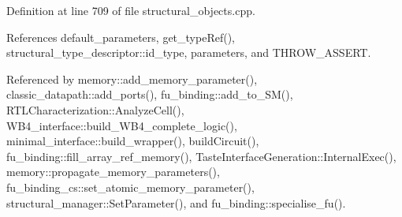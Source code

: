 Definition at line 709 of file structural\+\_\+objects.\+cpp.



References default\+\_\+parameters, get\+\_\+type\+Ref(), structural\+\_\+type\+\_\+descriptor\+::id\+\_\+type, parameters, and T\+H\+R\+O\+W\+\_\+\+A\+S\+S\+E\+RT.



Referenced by memory\+::add\+\_\+memory\+\_\+parameter(), classic\+\_\+datapath\+::add\+\_\+ports(), fu\+\_\+binding\+::add\+\_\+to\+\_\+\+S\+M(), R\+T\+L\+Characterization\+::\+Analyze\+Cell(), W\+B4\+\_\+interface\+::build\+\_\+\+W\+B4\+\_\+complete\+\_\+logic(), minimal\+\_\+interface\+::build\+\_\+wrapper(), build\+Circuit(), fu\+\_\+binding\+::fill\+\_\+array\+\_\+ref\+\_\+memory(), Taste\+Interface\+Generation\+::\+Internal\+Exec(), memory\+::propagate\+\_\+memory\+\_\+parameters(), fu\+\_\+binding\+\_\+cs\+::set\+\_\+atomic\+\_\+memory\+\_\+parameter(), structural\+\_\+manager\+::\+Set\+Parameter(), and fu\+\_\+binding\+::specialise\+\_\+fu().

